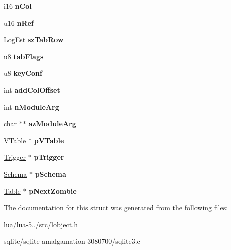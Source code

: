 \begin{DoxyCompactItemize}
\item 
\hypertarget{struct_table_a1a8346811ba23fdfd90c5b54076bbefb}{i16 {\bfseries n\+Col}}\label{struct_table_a1a8346811ba23fdfd90c5b54076bbefb}

\item 
\hypertarget{struct_table_a5c3d59f52186917d412d42e008dd302c}{u16 {\bfseries n\+Ref}}\label{struct_table_a5c3d59f52186917d412d42e008dd302c}

\item 
\hypertarget{struct_table_a141c547347c585b17f9ca2664967ab75}{Log\+Est {\bfseries sz\+Tab\+Row}}\label{struct_table_a141c547347c585b17f9ca2664967ab75}

\item 
\hypertarget{struct_table_ab0aeb112ae7e1b81e2a18bc493f7992c}{u8 {\bfseries tab\+Flags}}\label{struct_table_ab0aeb112ae7e1b81e2a18bc493f7992c}

\item 
\hypertarget{struct_table_add1b22425db781d976d25b4465a2965a}{u8 {\bfseries key\+Conf}}\label{struct_table_add1b22425db781d976d25b4465a2965a}

\item 
\hypertarget{struct_table_ab6f1ad10bce5c20faca55cd0a9c3f1ff}{int {\bfseries add\+Col\+Offset}}\label{struct_table_ab6f1ad10bce5c20faca55cd0a9c3f1ff}

\item 
\hypertarget{struct_table_a74a2c5547ea876ebe77dbea0d99361bf}{int {\bfseries n\+Module\+Arg}}\label{struct_table_a74a2c5547ea876ebe77dbea0d99361bf}

\item 
\hypertarget{struct_table_af3af6596efa41894bcd3c3c9f9b6781f}{char $\ast$$\ast$ {\bfseries az\+Module\+Arg}}\label{struct_table_af3af6596efa41894bcd3c3c9f9b6781f}

\item 
\hypertarget{struct_table_a7b9903cfbfefe7b8bf872c4f50cb2e95}{\hyperlink{struct_v_table}{V\+Table} $\ast$ {\bfseries p\+V\+Table}}\label{struct_table_a7b9903cfbfefe7b8bf872c4f50cb2e95}

\item 
\hypertarget{struct_table_aca61c40bb0164f2c6fc3406c28988660}{\hyperlink{struct_trigger}{Trigger} $\ast$ {\bfseries p\+Trigger}}\label{struct_table_aca61c40bb0164f2c6fc3406c28988660}

\item 
\hypertarget{struct_table_a1d6ce038a061722cebaeba0f3ffceacf}{\hyperlink{struct_schema}{Schema} $\ast$ {\bfseries p\+Schema}}\label{struct_table_a1d6ce038a061722cebaeba0f3ffceacf}

\item 
\hypertarget{struct_table_ae365eb0d8f6d3cb39f3908323cba45e4}{\hyperlink{struct_table}{Table} $\ast$ {\bfseries p\+Next\+Zombie}}\label{struct_table_ae365eb0d8f6d3cb39f3908323cba45e4}

\end{DoxyCompactItemize}


The documentation for this struct was generated from the following files\+:\begin{DoxyCompactItemize}
\item 
lua/lua-\/5../src/lobject.\+h\item 
sqlite/sqlite-\/amalgamation-\/3080700/sqlite3.\+c\end{DoxyCompactItemize}
